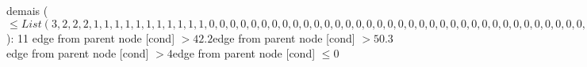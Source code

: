 {{{{{%
demais ($\leq List(3, 2, 2, 2, 1, 1, 1, 1, 1, 1, 1, 1, 1, 1, 1, 0, 0, 0, 0, 0, 0, 0, 0, 0, 0, 0, 0, 0, 0, 0, 0, 0, 0, 0, 0, 0, 0, 0, 0, 0, 0, 0, 0, 0, 0, 0, 0, 0, 0, 0, 0, 0, 0, 0, 0, 0, 0, 0, 0, 0, 0, 0, 0, 0, 0, 0, 0, 0, 0, 0, 0, 0, 0, 0, 0)$): 11} edge from parent node [cond] {$>42.2$}}edge from parent node [cond] {$>50.3$}}edge from parent node [cond] {$>4$}}edge from parent node [cond] {$\leq0$}}
